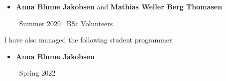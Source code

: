 \begin{itemize}
%

  \medskip

\item {\color{accent} \textbf{Anna Blume Jakobsen} and \textbf{Mathias Weller Berg Thomasen}}

  \smallskip

  \faCalendar\ Summer 2020 \hspace{82pt} \faGraduationCap\ BSc Volunteers

%
\end{itemize}

\smallskip

I have also managed the following student programmer.

\medskip

\begin{itemize}
\item {\color{accent} \textbf{Anna Blume Jakobsen}}

  \smallskip

  \faCalendar \ Spring 2022
\end{itemize}
